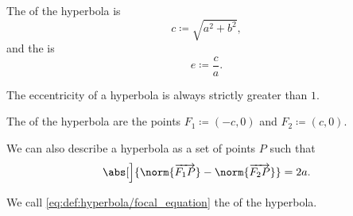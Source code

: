 \begin{definition}
\begin{thmenum}
     The  of the hyperbola is
    \begin{equation*}
      c \coloneq \sqrt{ a^2 + b^2 },
    \end{equation*}
    and the  is
    \begin{equation*}
      e \coloneqq \frac c a.
    \end{equation*}

    The eccentricity of a hyperbola is always strictly greater than \( 1 \).

     The  of the hyperbola are the points \( F_1 \coloneqq (-c, 0) \) and \( F_2 \coloneqq (c, 0) \).

     We can also describe a hyperbola as a set of points \( P \) such that
    \begin{equation}\label{eq:def:hyperbola/focal_equation}
      \abs[\Big]{ \norm{\vect{F_1 P}} - \norm{\vect{F_2 P}} } = 2a.
    \end{equation}

    We call \eqref{eq:def:hyperbola/focal_equation} the  of the hyperbola.
  \end{thmenum}
\end{definition}
